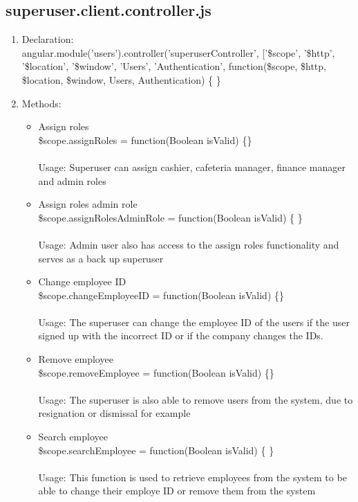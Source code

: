 \documentclass[a4paper,12pt]{article}
\begin{document}
\subsection{superuser.client.controller.js}
\begin{enumerate}
\item Declaration: \\ angular.module('users').controller('superuserController', ['\$scope', '\$http', '\$location', '\$window', 'Users', 'Authentication',
	function(\$scope, \$http, \$location, \$window, Users, Authentication) \{ \}
\item Methods: 
	\begin{itemize}
		\item Assign roles \\ \$scope.assignRoles = function(Boolean isValid) \{\} \\ \\
		Usage: Superuser can assign cashier, cafeteria manager, finance manager and admin roles
		\item Assign roles admin role \\ \$scope.assignRolesAdminRole = function(Boolean isValid) \{ \} \\ \\
		Usage: Admin user also has access to the assign roles functionality and serves as a back up superuser
		\item Change employee ID \\ \$scope.changeEmployeeID = function(Boolean isValid) \{\} \\ \\
		Usage: The superuser can change the employee ID of the users if the user signed up with the incorrect ID or if the company changes the IDs.
		\item Remove employee \\ \$scope.removeEmployee = function(Boolean isValid) \{\}
		\\ \\ Usage: The superuser is also able to remove users from the system, due to resignation or dismissal for example
		\item Search employee \\ \$scope.searchEmployee = function(Boolean isValid) \{ \}
		\\ \\ Usage: This function is used to retrieve employees from the system to be able to change their employe ID or remove them from the system

\end{itemize}
\end{enumerate}
\end{document}
